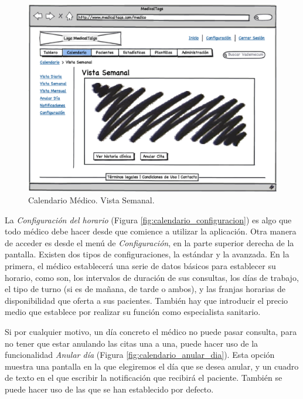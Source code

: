 			
			\begin{figure}[H]
			  \centering
			    \includegraphics[width=12cm]{img/eps/13_Calendario_Medico.eps}
			  \caption{Calendario Médico. Vista Semanal.}
			  \label{fig:calendario_vista_semanal}
			\end{figure}
			
			La \textit{Configuración del horario} (Figura \ref{fig:calendario_configuracion}) es algo que todo médico debe hacer desde que comience a utilizar la aplicación. Otra manera de acceder es desde el menú de \textit{Configuración}, en la parte superior derecha de la pantalla. 
			Existen dos tipos de configuraciones, la estándar y la avanzada. En la primera, el médico establecerá una serie de datos básicos para establecer su horario, como son, los intervalos de duración de sus consultas, los días de trabajo, el tipo de turno (si es de mañana, de tarde o ambos), y las franjas horarias de disponibilidad que oferta a sus pacientes. También hay que introducir el precio medio que establece por realizar su función como especialista sanitario.
			
				
				Si por cualquier motivo, un día concreto el médico no puede pasar consulta, para no tener que estar anulando las citas una a una, puede hacer uso de la funcionalidad \textit{Anular día} (Figura \ref{fig:calendario_anular_dia}). Esta opción muestra una pantalla en la que elegiremos el día que se desea anular, y un cuadro de texto en el que escribir la notificación que recibirá el paciente. También se puede hacer uso de las que se han establecido por defecto.
				
